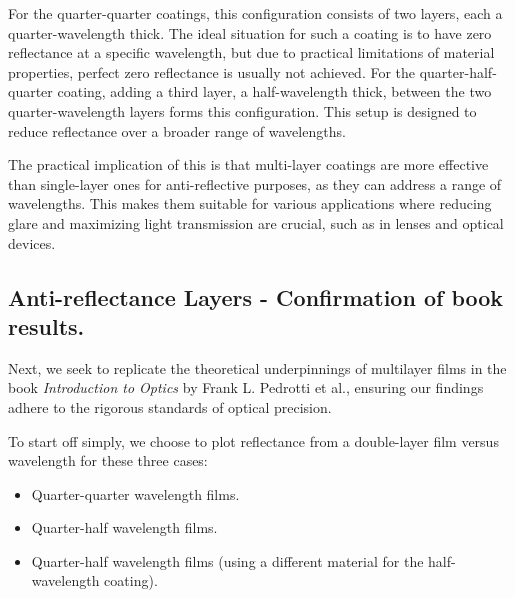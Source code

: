

For the quarter-quarter coatings, this configuration consists of two layers, each a quarter-wavelength thick. The ideal situation for such a coating is to have zero reflectance at a specific wavelength, but due to practical limitations of material properties, perfect zero reflectance is usually not achieved. For the quarter-half-quarter coating, adding a third layer, a half-wavelength thick, between the two quarter-wavelength layers forms this configuration. This setup is designed to reduce reflectance over a broader range of wavelengths.

The practical implication of this is that multi-layer coatings are more effective than single-layer ones for anti-reflective purposes, as they can address a range of wavelengths. This makes them suitable for various applications where reducing glare and maximizing light transmission are crucial, such as in lenses and optical devices.


\subsection{Anti-reflectance Layers - Confirmation of book results.}

Next, we seek to replicate the theoretical underpinnings of multilayer films in the book \emph{Introduction to Optics} by Frank L. Pedrotti et al., ensuring our findings adhere to the rigorous standards of optical precision.

To start off simply, we choose to plot reflectance from a double-layer film versus wavelength for these three cases:
\begin{itemize}
    \item Quarter-quarter wavelength films.
    \item Quarter-half wavelength films.
    \item Quarter-half wavelength films (using a different material for the half-wavelength coating).
\end{itemize}

